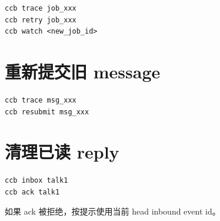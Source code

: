 \begin{lstlisting}
ccb trace job_xxx
ccb retry job_xxx
ccb watch <new_job_id>
\end{lstlisting}

\section{重新提交旧 message}

\begin{lstlisting}
ccb trace msg_xxx
ccb resubmit msg_xxx
\end{lstlisting}

\section{清理已读 reply}

\begin{lstlisting}
ccb inbox talk1
ccb ack talk1
\end{lstlisting}

如果 ack 被拒绝，按提示使用当前 head inbound event id。
